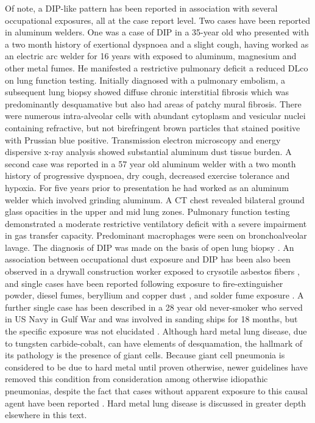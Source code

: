 \documentclass[a4
er,12pt]{article}
\begin{document}
Of note, a DIP-like pattern has been reported in association with several occupational exposures, all at the case report level. Two cases have been reported in aluminum welders. One was a case of DIP in a 35-year old \cite{Herbert1982} who presented with a two month history of exertional dyspnoea and a slight cough, having worked as an electric arc welder for 16 years with exposed to aluminum, magnesium and other metal fumes. He manifested a restrictive pulmonary deficit a reduced DLco on lung function testing. Initially diagnosed with a pulmonary embolism, a subsequent lung biopsy showed diffuse chronic interstitial fibrosis which was predominantly desquamative but also had areas of patchy mural fibrosis. There were numerous intra-alveolar cells with abundant cytoplasm and vesicular nuclei containing refractive, but not birefringent brown particles that stained positive with Prussian blue positive. Transmission electron microscopy and energy dispersive x-ray analysis showed substantial aluminum dust tissue burden. A second case was reported in a 57 year old aluminum welder with a two month history of progressive dyspnoea, dry cough, decreased exercise tolerance and hypoxia. For five years prior to presentation he had worked as an aluminum welder which involved grinding aluminum. A CT chest revealed bilateral ground glass opacities in the upper and mid lung zones. Pulmonary function testing demonstrated a moderate restrictive ventilatory deficit with a severe impairment in gas transfer capacity. Predominant macrophages were seen on bronchoalveolar lavage. The diagnosis of DIP was made on the basis of open lung biopsy \cite{Chelvanathan2011}. An association between occupational dust exposure and DIP has been also been  observed in a drywall construction worker exposed to crysotile asbestos fibers \cite{Freed1991}, and single cases have been reported following exposure to fire-extinguisher powder, diesel fumes, beryllium and copper dust \cite{Craig2004}, and solder fume exposure  \cite{Moon1999}. A further single case has been described in a 28 year old never-smoker who served in US Navy in Gulf War and was involved in sanding ships for 18 months, but the specific exposure was not elucidated \cite{SafdarM2011}. Although hard metal lung disease, due to tungsten carbide-cobalt, can have elements of desquamation, the hallmark of its pathology is the presence of giant cells. Because giant cell pneumonia is considered to be due to hard metal until proven otherwise, newer guidelines have removed this condition from consideration among otherwise idiopathic pneumonias, despite the fact that cases without apparent exposure to this causal agent have been reported \cite{Blanc2007}.  Hard metal lung disease is discussed in greater depth elsewhere in this text.
\end{document}
